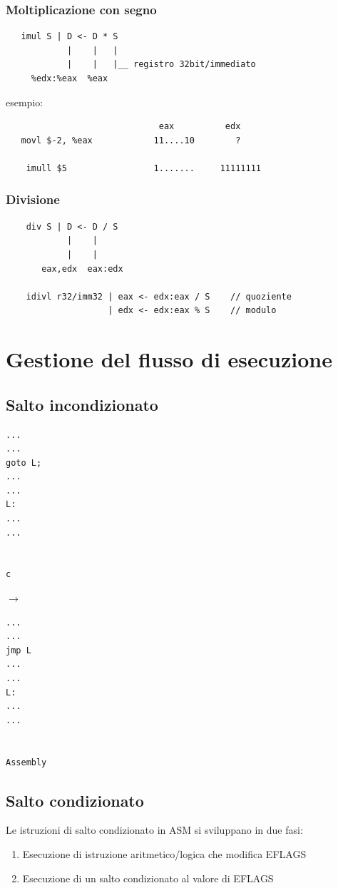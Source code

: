 \noindent \subsubsection{Moltiplicazione con segno}
\begin{verbatim}
   imul S | D <- D * S 
            |    |   |
            |    |   |__ registro 32bit/immediato
     %edx:%eax  %eax  
\end{verbatim}
\noindent esempio:
\begin{verbatim}
                              eax          edx 
   movl $-2, %eax            11....10        ?
                            
    imull $5                 1.......     11111111
\end{verbatim}

\subsubsection{Divisione}
\begin{verbatim}
    div S | D <- D / S
            |    |
            |    |
       eax,edx  eax:edx
                                            
    idivl r32/imm32 | eax <- edx:eax / S    // quoziente
                    | edx <- edx:eax % S    // modulo
\end{verbatim}

\section{Gestione del flusso di esecuzione}
\subsection{Salto incondizionato}
\begin{minipage}{0.4\textwidth}
\begin{verbatim}
...
...
goto L;
...
...
L:
...
...


c
\end{verbatim}
\end{minipage}
\hfill
$\longrightarrow$
\hfill
\begin{minipage}{0.4\textwidth}
\begin{verbatim}
...
...
jmp L
...
...
L:
...
...


Assembly
\end{verbatim}
\end{minipage}
\noindent

\subsection{Salto condizionato}
Le istruzioni di salto condizionato in ASM si sviluppano in due fasi:
\begin{enumerate}
    \item Esecuzione di istruzione aritmetico/logica che modifica EFLAGS
    \item Esecuzione di un salto condizionato al valore di EFLAGS
\end{enumerate}

